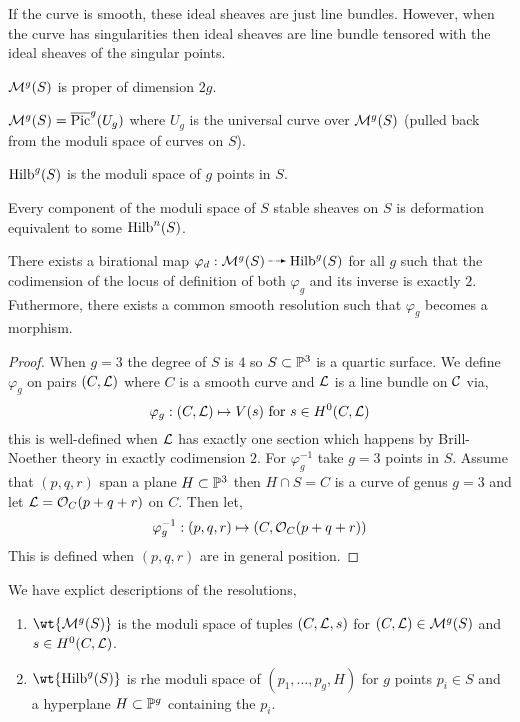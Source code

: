 \documentclass[12pt]{article}
\begin{document}
\begin{rmk}
If the curve is smooth, these ideal sheaves are just line bundles. However, when the curve has singularities then ideal sheaves are line bundle tensored with the ideal sheaves of the singular points.
\end{rmk}

\begin{prop}
$\M^g(S)$ is proper of dimension $2g$.
\end{prop}

\begin{prop}
$\M^g(S) = \overline{\mathrm{Pic}}^g(U_g)$ where $U_g$ is the universal curve over $\M^g(S)$ (pulled back from the moduli space of curves on $S$).
\end{prop}

\begin{defn}
$\Hilb^g(S)$ is the moduli space of $g$ points in $S$.
\end{defn}

\begin{thm}[Yoshioka '01]
Every component of the moduli space of $S$ stable sheaves on $S$ is deformation equivalent to some $\Hilb^n(S)$.
\end{thm}

\begin{thm}[T]
There exists a birational map $\varphi_d : \M^g(S) \rat \Hilb^g(S)$ for all $g$ such that the codimension of the locus of definition of both $\varphi_g$ and its inverse is exactly $2$. Futhermore, there exists a common smooth resolution such that $\varphi_g$ becomes a morphism. 
\end{thm}

\begin{proof}
When $g = 3$ the degree of $S$ is $4$ so $S \subset \P^3$ is a quartic surface. We define $\varphi_g$ on pairs $(C, \L)$ where $C$ is a smooth curve and $\L$ is a line bundle on $\C$ via,
\[ \varphi_g : (C, \L) \mapsto V(s) \text{ for } s \in H^0(C, \L) \]
this is well-defined when $\L$ has exactly one section which happens by Brill-Noether theory in exactly codimension $2$. For $\varphi_g^{-1}$ take $g = 3$ points in $S$. Assume that $(p,q,r)$ span a plane $H \subset \P^3$ then $H \cap S = C$ is a curve of genus $g = 3$ and let $\L = \struct{C}(p+q+r)$ on $C$. Then let,
\[ \varphi_g^{-1} : (p,q,r) \mapsto (C, \struct{C}(p + q + r)) \]
This is defined when $(p,q,r)$ are in general position. 
\end{proof}

\begin{defn}
We have explict descriptions of the resolutions,
\begin{enumerate}
\item $\wt{\M^g(S)}$ is the moduli space of tuples $(C, \L, s)$ for $(C, \L) \in \M^g(S)$ and $s \in H^0(C, \L)$. 

\item  $\wt{\Hilb^g(S)}$ is rhe moduli space of $(p_1, \dots, p_g, H)$ for $g$ points $p_i \in S$ and a hyperplane $H \subset \P^g$ containing the $p_i$.
\end{enumerate}
\end{defn}
\end{document}

